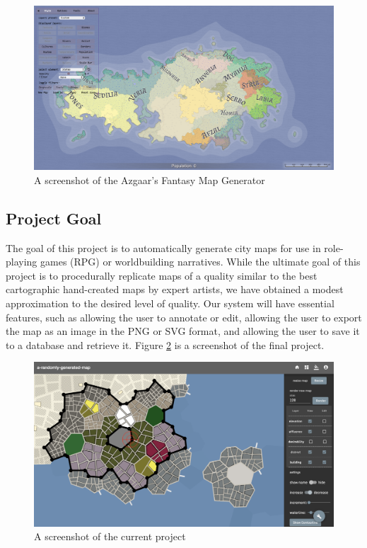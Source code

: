 \begin{figure}[!htb]
\centering
\includegraphics[width=\textwidth]{section01/assets/screenshot_FMG.png}
\caption[A screenshot of the Azgaar's Fantasy Map Generator]{\label{fig:Screenshot FMG}A screenshot of the Azgaar's Fantasy Map Generator}
\end{figure}

\subsection{Project Goal}
\label{sec:Introduction>Project Goal}
The goal of this project is to automatically generate city maps for use in role-playing games (RPG) or worldbuilding narratives. While the ultimate goal of this project is to procedurally replicate maps of a quality similar to the best cartographic hand-created maps by expert artists, we have obtained a modest approximation to the desired level of quality. Our system will have essential features, such as allowing the user to annotate or edit, allowing the user to export the map as an image in the PNG or SVG format, and allowing the user to save it to a database and retrieve it. Figure \ref{fig:Screenshot Metropolist} is a screenshot of the final project.

\begin{figure}[!htb]
\centering
\includegraphics[width=\textwidth]{section01/assets/screenshot_Metropolist.png}
\caption[A screenshot of the current project]{\label{fig:Screenshot Metropolist}A screenshot of the current project}
\end{figure}

